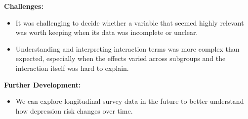 \documentclass[a4paper, 12pt]{article}
\begin{document}
\textbf{Challenges:}

\begin{itemize}
    \item It was challenging to decide whether a variable that seemed highly relevant was worth keeping when its data was incomplete or unclear.
    \item Understanding and interpreting interaction terms was more complex than expected, especially when the effects varied across subgroups and the interaction itself was hard to explain.
\end{itemize}

\textbf{Further Development:}

\begin{itemize}
    \item We can explore longitudinal survey data in the future to better understand how depression risk changes over time.
\end{itemize}
\end{document}
